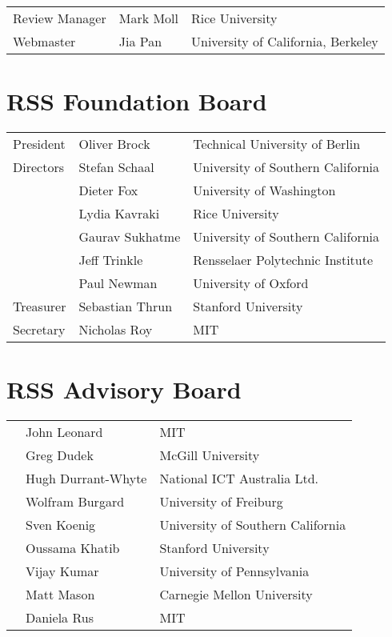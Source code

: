 \begin{tabular}{>{\raggedleft}p{5cm}p{4.5cm}>{\small}p{7cm}}
Review Manager & Mark Moll & Rice University\\
Webmaster &Jia Pan& University of California, Berkeley\\
\end{tabular}

\vspace{0.5cm}
\section{RSS Foundation Board}

\begin{tabular}{>{\raggedleft}p{5cm}p{4.5cm}>{\small}p{7cm}}
President & Oliver Brock & Technical University of Berlin\\
Directors & Stefan Schaal & University of Southern California\\
& Dieter Fox & University of Washington\\
& Lydia Kavraki & Rice University \\
& Gaurav Sukhatme & University of Southern California \\
& Jeff Trinkle & Rensselaer Polytechnic Institute \\
& Paul Newman & University of Oxford \\
Treasurer & Sebastian Thrun & Stanford University\\
Secretary & Nicholas Roy & MIT\\
\end{tabular}

\vspace{0.5cm}
\section{RSS Advisory Board}

\begin{tabular}{>{\raggedleft}p{5cm}p{4.5cm}>{\small}p{7cm}}
& John Leonard & MIT\\
& Greg Dudek & McGill University \\
&Hugh Durrant-Whyte &National ICT Australia Ltd.\\
&Wolfram Burgard &University of Freiburg\\
&Sven Koenig&University of Southern California\\
&Oussama Khatib&Stanford University\\
&Vijay Kumar&University of Pennsylvania\\
&Matt Mason&Carnegie Mellon University\\
&Daniela Rus&MIT\\
\end{tabular}

%
%
